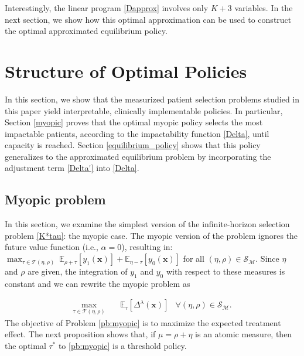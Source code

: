 \documentclass[12pt,a4paper]{article}
\newcommand{\bx}{\mathbf{x}}
\newcommand{\mA}{\mathcal{A}}
\newcommand{\mX}{\mathcal{X}}
\newcommand{\mS}{\mathcal{S}}
\newcommand{\mT}{\mathcal{T}}
\newcommand{\mM}{\mathcal{M}}
\begin{document}
Interestingly, the linear program \eqref{Dapprox} involves only $K + 3$ variables. 
In the next section, we show how this optimal approximation can be used to construct the optimal approximated equilibrium policy.



		\section{Structure of Optimal Policies \label{sec:approx_policies}}
		
In this section, we show that the measurized patient selection problems studied in this paper yield interpretable, clinically implementable policies. In particular, Section \ref{myopic} proves that the optimal myopic policy selects the most impactable patients, according to the impactability function \eqref{Delta}, until capacity is reached. Section \ref{equilibrium_policy} shows that this policy generalizes to the approximated equilibrium problem by incorporating the adjustment term \eqref{Delta'} into \eqref{Delta}.
	
		\subsection{Myopic problem \label{myopic}}
		
		In this section, we examine the simplest version of the infinite-horizon selection problem \eqref{K*tau}: the myopic case. The myopic version of the problem ignores the future value function (i.e., $\alpha=0$), resulting in: $\max_{\tau \in \mT(\eta,\rho)}  \ \mathbb{E}_{\rho+\tau}\left[  y_1(\bx) \right] +\mathbb{E}_{\eta-\tau}\left[  y_0(\bx) \right]$  for all $(\eta,\rho) \in \mS_\mM$.
		Since $\eta$ and $\rho$ are given, the integration of $y_1$ and $y_0$ with respect to these measures is constant and we can rewrite the myopic problem as
		
		
		\begin{align}
			\max_{\tau \in \mT(\eta,\rho) } & \quad \mathbb{E}_\tau \left[  \Delta^\lambda(\bx)\right]  &\forall (\eta,\rho) \in \mS_\mM.\label{pb:myopic} %
		\end{align}
		The objective of Problem \eqref{pb:myopic} is to maximize the expected treatment effect. The next proposition shows that, if $\mu=\rho+\eta$ is an atomic measure, then the optimal $\tau^*$ to \eqref{pb:myopic} is a threshold policy.
\end{document}

